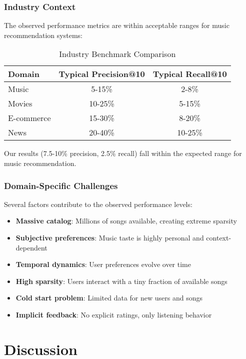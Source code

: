 \documentclass[12pt,a4paper]{article}
\begin{document}
\subsubsection{Industry Context}
The observed performance metrics are within acceptable ranges for music recommendation systems:

\begin{table}[H]
\centering
\caption{Industry Benchmark Comparison}
\begin{tabular}{lcc}
\toprule
Domain & Typical Precision@10 & Typical Recall@10 \\
\midrule
Music & 5-15\% & 2-8\% \\
Movies & 10-25\% & 5-15\% \\
E-commerce & 15-30\% & 8-20\% \\
News & 20-40\% & 10-25\% \\
\bottomrule
\end{tabular}
\end{table}

Our results (7.5-10\% precision, 2.5\% recall) fall within the expected range for music recommendation.

\subsubsection{Domain-Specific Challenges}
Several factors contribute to the observed performance levels:

\begin{itemize}
    \item \textbf{Massive catalog}: Millions of songs available, creating extreme sparsity
    \item \textbf{Subjective preferences}: Music taste is highly personal and context-dependent
    \item \textbf{Temporal dynamics}: User preferences evolve over time
    \item \textbf{High sparsity}: Users interact with a tiny fraction of available songs
    \item \textbf{Cold start problem}: Limited data for new users and songs
    \item \textbf{Implicit feedback}: No explicit ratings, only listening behavior
\end{itemize}

\section{Discussion}
\end{document}
